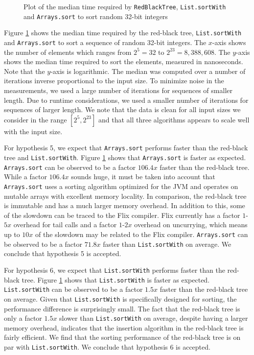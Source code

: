 \documentclass[../main.tex]{subfiles}
\begin{document}
\begin{figure}[H]
  \centering
  
  \caption{Plot of the median \textsf{time} required by \lstinline{RedBlackTree}, \lstinline{List.sortWith} and \lstinline{Arrays.sort} to sort random 32-bit integers}
  \label{sorting-plot}
\end{figure}

Figure \ref{sorting-plot} shows the median time required by the red-black tree, \lstinline{List.sortWith} and \lstinline{Arrays.sort} to sort a sequence of random 32-bit integers. The $x$-axis shows the number of elements which ranges from $2^5 = 32$ to $2^{23} = 8,388,608$. The $y$-axis shows the median time required to sort the elements, measured in nanoseconds. Note that the $y$-axis is logarithmic. The median was computed over a number of iterations inverse proportional to the input size. To minimize noise in the measurements, we used a large number of iterations for sequences of smaller length. Due to runtime considerations, we used a smaller number of iterations for sequences of larger length. We note that the data is clean for all input sizes we consider in the range $[2^5, 2^{23}]$ and that all three algorithms appears to scale well with the input size.

For hypothesis 5, we expect that \lstinline{Arrays.sort} performs faster than the red-black tree and \lstinline{List.sortWith}. Figure \ref{sorting-plot} shows that \lstinline{Arrays.sort} is faster as expected. \lstinline{Arrays.sort} can be observed to be a factor $106.4x$ faster than the red-black tree. While a factor $106.4x$ sounds huge, it must be taken into account that \lstinline{Arrays.sort} uses a sorting algorithm optimized for the JVM and operates on mutable arrays with excellent memory locality. In comparison, the red-black tree is immutable and has a much larger memory overhead. In addition to this, some of the slowdown can be traced to the Flix compiler. Flix currently has a factor $1$-$5x$ overhead for tail calls and a factor $1$-$2x$ overhead on uncurrying, which means up to $10x$ of the slowdown may be related to the Flix compiler. \lstinline{Arrays.sort} can be observed to be a factor $71.8x$ faster than \lstinline{List.sortWith} on average. We conclude that hypothesis 5 is accepted.

For hypothesis 6, we expect that \lstinline{List.sortWith} performs faster than the red-black tree. Figure \ref{sorting-plot} shows that \lstinline{List.sortWith} is faster as expected. \lstinline{List.sortWith} can be observed to be a factor $1.5x$ faster than the red-black tree on average. Given that \lstinline{List.sortWith} is specifically designed for sorting, the performance difference is surprisingly small. The fact that the red-black tree is only a factor $1.5x$ slower than \lstinline{List.sortWith} on average, despite having a larger memory overhead, indicates that the insertion algorithm in the red-black tree is fairly efficient. We find that the sorting performance of the red-black tree is on par with \lstinline{List.sortWith}. We conclude that hypothesis 6 is accepted.
\end{document}
